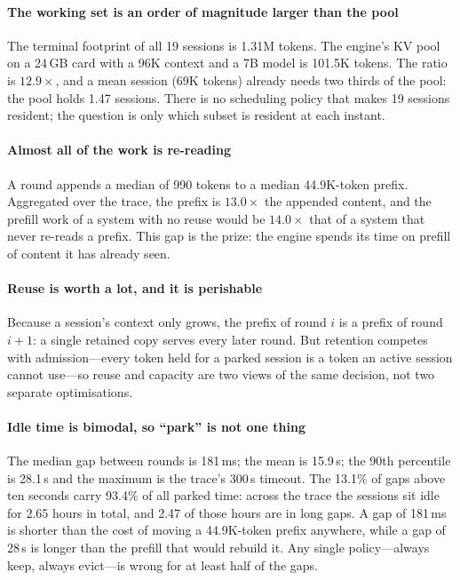 \paragraph{The working set is an order of magnitude larger than the pool}
The terminal footprint of all 19 sessions is 1.31M tokens. The engine's KV pool on a
24\,GB card with a 96K context and a 7B model is 101.5K tokens. The ratio is
$12.9\times$, and a mean session (69K tokens) already needs two thirds of the pool: the
pool holds 1.47 sessions. There is no scheduling policy that makes 19 sessions resident;
the question is only which subset is resident at each instant.

\paragraph{Almost all of the work is re-reading}
A round appends a median of 990 tokens to a median 44.9K-token prefix. Aggregated over the
trace, the prefix is $13.0\times$ the appended content, and the prefill work of a system
with no reuse would be $14.0\times$ that of a system that never re-reads a prefix. This
gap is the prize: the engine spends its time on prefill of content it has already seen.

\paragraph{Reuse is worth a lot, and it is perishable}
Because a session's context only grows, the prefix of round $i$ is a prefix of round
$i+1$: a single retained copy serves every later round. But retention competes with
admission---every token held for a parked session is a token an active session cannot
use---so reuse and capacity are two views of the same decision, not two separate
optimisations.

\paragraph{Idle time is bimodal, so ``park'' is not one thing}
The median gap between rounds is 181\,ms; the mean is 15.9\,s; the 90th percentile is
28.1\,s and the maximum is the trace's 300\,s timeout. The 13.1\% of gaps above ten
seconds carry 93.4\% of all parked time: across the trace the sessions sit idle for 2.65
hours in total, and 2.47 of those hours are in long gaps. A gap of 181\,ms is shorter than
the cost of moving a 44.9K-token prefix anywhere, while a gap of 28\,s is longer than the
prefill that would rebuild it. Any single policy---always keep, always evict---is wrong
for at least half of the gaps.

